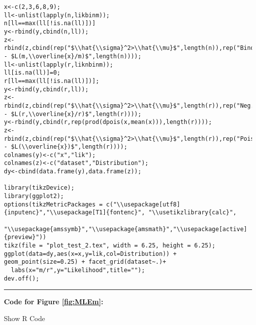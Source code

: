 \documentclass[]{book}
\theoremstyle{definition}
\theoremstyle{definition}
\theoremstyle{definition}
\theoremstyle{remark}
\begin{document}
\begin{verbatim}
x<-c(2,3,6,8,9);
ll<-unlist(lapply(n,likbinm));
n[ll==max(ll[!is.na(ll)])]
y<-rbind(y,cbind(n,ll));
z<-rbind(z,cbind(rep("$\\hat{\\sigma}^2>\\hat{\\mu}$",length(n)),rep("Binomial - $L(m,\\overline{x}/m)$",length(n))));
ll<-unlist(lapply(r,liknbinm));
ll[is.na(ll)]=0;
r[ll==max(ll[!is.na(ll)])];
y<-rbind(y,cbind(r,ll));
z<-rbind(z,cbind(rep("$\\hat{\\sigma}^2>\\hat{\\mu}$",length(r)),rep("Neg.Binomial - $L(r,\\overline{x}/r)$",length(r))));
y<-rbind(y,cbind(r,rep(prod(dpois(x,mean(x))),length(r))));
z<-rbind(z,cbind(rep("$\\hat{\\sigma}^2>\\hat{\\mu}$",length(r)),rep("Poisson - $L(\\overline{x})$",length(r))));
colnames(y)<-c("x","lik");
colnames(z)<-c("dataset","Distribution");
dy<-cbind(data.frame(y),data.frame(z));

library(tikzDevice);
library(ggplot2);
options(tikzMetricPackages = c("\\usepackage[utf8]{inputenc}","\\usepackage[T1]{fontenc}", "\\usetikzlibrary{calc}", 
                               "\\usepackage{amssymb}","\\usepackage{amsmath}","\\usepackage[active]{preview}"))
tikz(file = "plot_test_2.tex", width = 6.25, height = 6.25);
ggplot(data=dy,aes(x=x,y=lik,col=Distribution)) + geom_point(size=0.25) + facet_grid(dataset~.)+
  labs(x="m/r",y="Likelihood",title=""); 
dev.off();
\end{verbatim}

\begin{center}\rule{0.5\linewidth}{\linethickness}\end{center}

\textbf{Code for Figure \ref{fig:MLEm}:}

Show R Code
\end{document}
